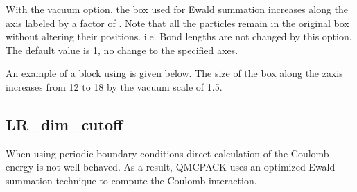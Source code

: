 \documentclass[letterpaper,10pt,english]{sphinxmanual}
\begin{document}
With the vacuum option, the box used for Ewald summation increases along
the axis labeled by a factor of . Note that all the particles remain in
the original box without altering their positions. i.e. Bond lengths are
not changed by this option. The default value is 1, no change to the
specified axes.

An example of a  block using is given below. The size of the box along
the z\sphinxhyphen{}axis increases from 12 to 18 by the vacuum scale of 1.5.

\begin{sphinxVerbatim}[commandchars=\\\{\}]
     
                    
                    
                   
     
         
       
       
\end{sphinxVerbatim}


\subsection{LR\_dim\_cutoff}
\label{\detokenize{simulationcell:lr-dim-cutoff}}
When using periodic boundary conditions direct calculation of the
Coulomb energy is not well behaved. As a result, QMCPACK uses an
optimized Ewald summation technique to compute the Coulomb
interaction. 
\end{document}
